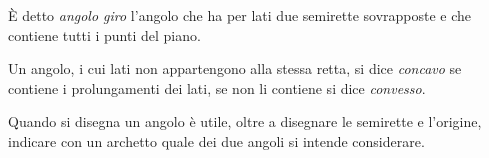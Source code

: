 \begin{definizione}
\`E detto \emph{angolo giro} l'angolo che ha per lati due semirette 
sovrapposte e che contiene tutti i punti del piano. 
\end{definizione}

\begin{inaccessibleblock}
 \begin{center} 
  
 \end{center}
\end{inaccessibleblock}

\begin{definizione}
Un angolo, i cui lati non appartengono alla stessa retta, si dice 
\emph{concavo} se contiene i prolungamenti dei lati, se non li 
contiene si dice \emph{convesso}.
\end{definizione}

\begin{center}  \end{center}

Quando si disegna un angolo è utile, oltre a disegnare le semirette e 
l'origine, indicare con un archetto quale dei due angoli si intende 
considerare.


